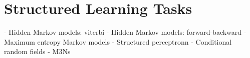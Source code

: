 
\chapter{Structured Learning Tasks} \label{sec:srl}

\chapterquote{}{}

\begin{learningobjectives}
\item \TODO
\end{learningobjectives}

\dependencies{}

\begin{chapternotes}

   - Hidden Markov models: viterbi
   - Hidden Markov models: forward-backward
   - Maximum entropy Markov models
   - Structured perceptronn
   - Conditional random fields
   - M3Ns

\end{chapternotes}

\begin{exercises}
\begin{Ex}
\TODO

\begin{solution}
\TODO
\end{solution}
\end{Ex}

\end{exercises}
